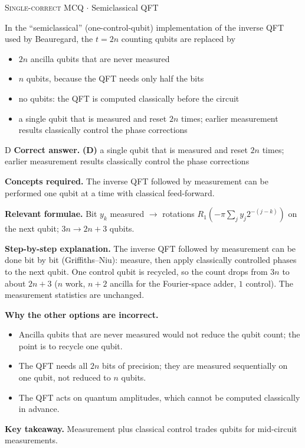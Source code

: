 \documentclass[11pt,a4paper]{article}
\newcommand{\optlabel}[1]{\textbf{(#1)}}
\newcommand{\correctlabel}[1]{\textcolor{okgreen}{\textbf{(#1)}\,\ding{51}}}
\newenvironment{qitem}[1]{\begin{list}{}{\setlength{\leftmargin}{3.3em}\setlength{\labelwidth}{3.1em}%
  \setlength{\labelsep}{0.2em}\setlength{\topsep}{3pt}\setlength{\parsep}{3pt}}\item[\textbf{Q.#1}\hfill]}{\end{list}}
\newcommand{\qsep}{\par\vspace{2pt}{\color{black!15}\hrule}\vspace{4pt}}
\newcommand{\qmeta}[2]{{\footnotesize\color{black!60}\textsc{#1} \;$\cdot$\; #2}\par}
\begin{document}
\begin{qitem}{64}
\qmeta{Single-correct MCQ}{Semiclassical QFT}
In the ``semiclassical'' (one-control-qubit) implementation of the inverse QFT used by Beauregard, the $t = 2n$ counting qubits are replaced by
\begin{itemize}[leftmargin=2.6em, labelsep=0.4em, itemsep=2pt, topsep=3pt]
\item[\optlabel{A}] $2n$ ancilla qubits that are never measured
\item[\optlabel{B}] $n$ qubits, because the QFT needs only half the bits
\item[\optlabel{C}] no qubits: the QFT is computed classically before the circuit
\item[\correctlabel{D}] a single qubit that is measured and reset $2n$ times; earlier measurement results classically control the phase corrections
\end{itemize}
\end{qitem}
\begin{solbox}{D}
\textbf{\color{brand}Correct answer.} \textcolor{okgreen}{\textbf{(D)}} a single qubit that is measured and reset $2n$ times; earlier measurement results classically control the phase corrections

\textbf{\color{brand}Concepts required.} The inverse QFT followed by measurement can be performed one qubit at a time with classical feed-forward.

\textbf{\color{brand}Relevant formulae.} Bit $y_k$ measured $\to$ rotations $R_1(-\pi\sum_{j}y_j2^{-(j-k)})$ on the next qubit; $3n \to 2n + 3$ qubits.

\textbf{\color{brand}Step-by-step explanation.} The inverse QFT followed by measurement can be done bit by bit (Griffiths--Niu): measure, then apply classically controlled phases to the next qubit.
One control qubit is recycled, so the count drops from $3n$ to about $2n + 3$ ($n$ work, $n + 2$ ancilla for the Fourier-space adder, $1$ control). The
measurement statistics are unchanged.

\textbf{\color{brand}Why the other options are incorrect.}
\begin{itemize}[leftmargin=2.4em, itemsep=1pt, topsep=2pt]
\item[\textbf{(A)}] Ancilla qubits that are never measured would not reduce the qubit count; the point is to recycle one qubit.
\item[\textbf{(B)}] The QFT needs all $2n$ bits of precision; they are measured sequentially on one qubit, not reduced to $n$ qubits.
\item[\textbf{(C)}] The QFT acts on quantum amplitudes, which cannot be computed classically in advance.
\end{itemize}
\textbf{\color{brand}Key takeaway.} Measurement plus classical control trades qubits for mid-circuit measurements.
\end{solbox}
\qsep
\end{document}
